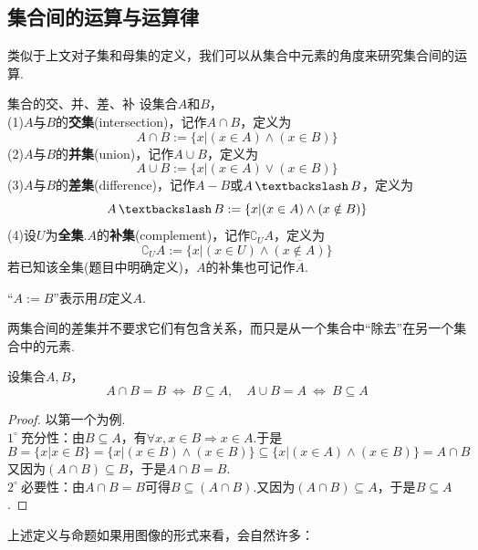 \documentclass[lang=cn, zihao=5]{elegantbook}
\newcommand{\buzhou}[1]{$#1^{\circ} \ $}
\DeclareMathOperator{\setjianfa}{\textbackslash}
\begin{document}
\subsection{集合间的运算与运算律}

类似于上文对子集和母集的定义，我们可以从集合中元素的角度来研究集合间的运算.

\begin{definition}{集合的交、并、差、补}
	设集合$A$和$B$， \\
	(1)$A$与$B$的\textbf{交集}(intersection)，记作$A \cap B$，定义为$$A \cap B := \{ x|(x \in A) \wedge (x \in B) \}$$
	(2)$A$与$B$的\textbf{并集}(union)，记作$A \cup B$，定义为$$A \cup B := \{ x|(x \in A) \vee (x \in B) \}$$
	(3)$A$与$B$的\textbf{差集}(difference)，记作$A-B$或$A \setjianfa B$，定义为$$A \setjianfa B := \{ x|(x \in A) \wedge (x \notin B) \}$$
	(4)设$U$为\textbf{全集}.$A$的\textbf{补集}(complement)，记作$\complement _{U}{A}$，定义为$$\complement _{U}{A} := \{ x|(x \in U) \wedge (x \notin A) \}$$
	若已知该全集(题目中明确定义)，$A$的补集也可记作$\overline{A}$.
\end{definition}
\begin{remark}
	“$A := B$”表示用$B$定义$A$.
\end{remark}
\begin{note}
	两集合间的差集并不要求它们有包含关系，而只是从一个集合中“除去”在另一个集合中的元素.
\end{note}

\begin{proposition}
	设集合$A,B$，
	$$A \cap B = B ~ \Leftrightarrow ~ B \subseteq A ,\quad A \cup B = A ~ \Leftrightarrow ~ B \subseteq A$$
\end{proposition}
\begin{proof}
	以第一个为例. \\
	\buzhou{1}充分性：由$B \subseteq A$，有$\forall x, x \in B \Rightarrow x \in A$.于是$$B = \{ x|x \in B \} = \{ x|(x \in B) \wedge (x \in B) \} \subseteq \{ x|(x \in A) \wedge (x \in B) \} = A \cap B$$
	又因为$(A \cap B) \subseteq B$，于是$A \cap B = B$. \\
	\buzhou{2}必要性：由$A \cap B = B$可得$B \subseteq (A \cap B)$.又因为$(A \cap B) \subseteq A$，于是$B \subseteq A$.
\end{proof}

上述定义与命题如果用图像的形式来看，会自然许多：
\end{document}
